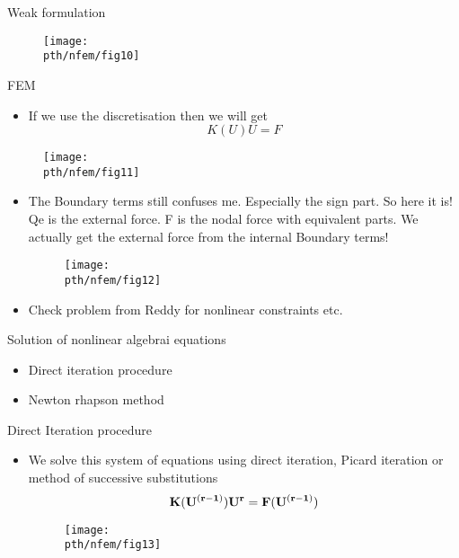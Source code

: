 	\begin{frame}{Weak formulation}
	\begin{figure}
			\centering
			\texttt{[image: \\pth/nfem/fig10]} 
		\end{figure}
	\end{frame}


	\begin{frame}{FEM}
		\begin{itemize}
			\item If we use the discretisation then we will get 
			\begin{equation}
			K(U)U = F
			\end{equation}
		\end{itemize} 
		\begin{figure}
		\centering
		\texttt{[image: \\pth/nfem/fig11]} 
		\end{figure}
	\end{frame}


	\begin{frame}
		\begin{itemize}
			\item The Boundary terms still confuses me. Especially the sign part. So here it is! Qe is the external force. F is the nodal force with equivalent parts. We actually get the external force from the internal Boundary terms!
			\begin{figure}
				\centering
				\texttt{[image: \\pth/nfem/fig12]} 
			\end{figure}
			\item Check problem from Reddy for nonlinear constraints etc.
		\end{itemize}
	\end{frame}



	\begin{frame}{Solution of nonlinear algebrai equations	}
		\begin{itemize}
			\item Direct iteration procedure
			\item Newton rhapson method
		\end{itemize}
	\end{frame}


	\begin{frame}{Direct Iteration procedure}
		\begin{itemize}
			\item We solve this system of equations using direct iteration, Picard iteration or method of successive substitutions
			\begin{equation}
				\mathbf{K(U^{(r-1)})U^r = F(U^{(r-1)})}
			\end{equation}
			\begin{figure}
				\centering
				\texttt{[image: \\pth/nfem/fig13]} 
			\end{figure}
		\end{itemize}
	\end{frame}


